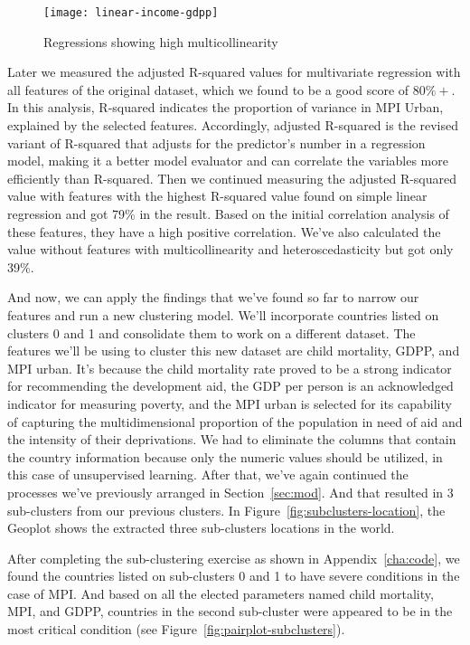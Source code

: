 \documentclass{swfuthesise}
\begin{document}
\begin{figure}[!htp]
    \centering
    \texttt{[image: linear-income-gdpp]}
    \caption{Regressions showing high multicollinearity}
    \label{fig:linear-income-gdpp}
\end{figure}

Later we measured the adjusted R-squared values for multivariate regression with all features of the original dataset, which we found to be a good score of \(80\%+\). In this analysis, R-squared indicates the proportion of variance in MPI Urban, explained by the selected features. Accordingly, adjusted R-squared is the revised variant of R-squared that adjusts for the predictor's number in a regression model, making it a better model evaluator and can correlate the variables more efficiently than R-squared. Then we continued measuring the adjusted R-squared value with features with the highest R-squared value found on simple linear regression and got 79\% in the result. Based on the initial correlation analysis of these features, they have a high positive correlation. We've also calculated the value without features with multicollinearity and heteroscedasticity but got only 39\%.

And now, we can apply the findings that we've found so far to narrow our features and run
a new clustering model. We'll incorporate countries listed on clusters 0 and 1 and
consolidate them to work on a different dataset. The features we'll be using to cluster this new
dataset are child mortality, GDPP, and MPI urban. It's because the child mortality rate proved to be a strong indicator for recommending the development aid, the GDP per person is an acknowledged indicator for measuring poverty, and the MPI urban is selected for its capability of capturing the multidimensional proportion of the population in need of aid and the intensity of their deprivations. We had to eliminate the columns that contain the
country information because only the numeric values should be utilized, in this case of
unsupervised learning. After that, we've again continued the processes we've previously
arranged in Section~\ref{sec:mod}. And that resulted in 3 sub-clusters from our previous clusters. In Figure~\ref{fig:subclusters-location}, the Geoplot shows the extracted three
sub-clusters locations in the world.

After completing the sub-clustering exercise as shown in Appendix~\ref{cha:code}, we found the
countries listed on sub-clusters 0 and 1 to have severe conditions in the case of MPI. And based on all the elected parameters named child mortality, MPI, and GDPP, countries in the second sub-cluster were appeared to be in the most critical condition (see Figure~\ref{fig:pairplot-subclusters}).
\end{document}
